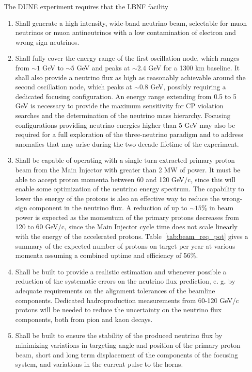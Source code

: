 The DUNE experiment requires that the LBNF facility
\begin{enumerate} 
\item Shall generate a high intensity, wide-band neutrino beam,
  selectable for muon neutrinos or muon antineutrinos with a low
  contamination of electron and wrong-sign neutrinos.
\item Shall fully cover the energy range of the first oscillation
  node, which ranges from $\sim1$ GeV to $\sim5$ GeV and peaks at
  $\sim2.4$ GeV for a 1300 km baseline. It shall also provide a
  neutrino flux as high as reasonably achievable around the second
  oscillation node, which peaks at $\sim0.8$ GeV, possibly requiring
  a dedicated focusing configuration. An energy range extending
  from 0.5 to 5 GeV is necessary to provide the maximum sensitivity
  for CP violation searches and the determination of the neutrino mass
  hierarchy. Focusing configurations providing neutrino energies
  higher than 5 GeV may also be required for a full exploration of the
  three-neutrino paradigm and to address anomalies that may arise
  during the two decade lifetime of the experiment. 
\item Shall be capable of operating with a single-turn extracted primary proton beam
  from the Main Injector with greater than 2 MW of power. It must be
  able to accept proton momenta between 60 and 120 GeV/c, since this
  will enable some optimization of the neutrino energy spectrum. The
  capability to lower the energy of the protons is also an
  effective way to reduce the wrong-sign component in the neutrino
  flux. A reduction of up to $\sim15 \%$ in beam power is expected as
  the momentum of the primary protons decreases from 120 to 60 GeV/c,
  since the Main Injector cycle time does not scale linearly with the
  energy of the accelerated protons.  Table~\ref{tab:beam_req_pot} gives a
  summary of the expected number of protons on target per year at
  various momenta assuming a combined uptime and efficiency of 56\%. 
\item Shall be built to provide a realistic estimation and whenever
  possible a reduction of the systematic errors on the neutrino flux prediction, e. g. by adequate requirements on the alignment tolerances of the beamline components. Dedicated hadroproduction measurements from 60-120 GeV/c protons will be needed to reduce the uncertainty on the neutrino flux components, both from pion and kaon decays. 
\item Shall be built to ensure the stability of the produced neutrino flux by minimizing variations in targeting angle and position of the primary proton beam, short and long term displacement of the components of the focusing system, and variations in the current pulse to the horns.
\end{enumerate}
